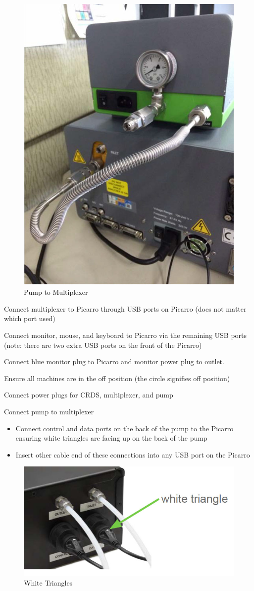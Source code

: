 \documentclass[12pt]{../SOP3}\usepackage[]{graphicx}\usepackage[]{color}
\begin{document}
\begin{figure}[h]
\includegraphics[width=.5\textwidth]{"graphics/pump_multiplexer"}
\caption{Pump to Multiplexer}
\end{figure}


\NP Connect multiplexer to Picarro through USB ports on Picarro (does not matter which port used)

\NP Connect monitor, mouse, and keyboard to Picarro via the remaining USB ports (note: there are two extra USB ports on the front of the Picarro)

\NP Connect blue monitor plug to Picarro and monitor power plug to outlet.

\NP Ensure all machines are in the off position (the circle signifies off position)

\NP Connect power plugs for CRDS, multiplexer, and pump

\NP Connect pump to multiplexer
\begin{itemize}
\item Connect control and data ports on the back of the pump to the Picarro ensuring white triangles are facing up on the back of the pump
\item Insert other cable end of these connections into any USB port on the Picarro
\end{itemize}

\begin{figure} 
\includegraphics[width=.5\textwidth]{"graphics/whitetriangleusb"}
\caption{White Triangles}
\end{figure}
\end{document}

